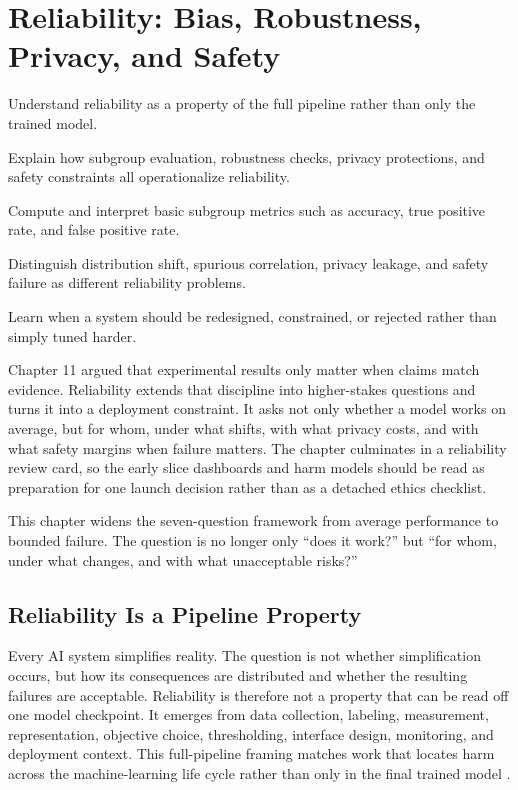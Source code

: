 \chapter{Reliability: Bias, Robustness, Privacy, and Safety}

\begin{learninggoals}
\item Understand reliability as a property of the full pipeline rather than only the trained model.
\item Explain how subgroup evaluation, robustness checks, privacy protections, and safety constraints all operationalize reliability.
\item Compute and interpret basic subgroup metrics such as accuracy, true positive rate, and false positive rate.
\item Distinguish distribution shift, spurious correlation, privacy leakage, and safety failure as different reliability problems.
\item Learn when a system should be redesigned, constrained, or rejected rather than simply tuned harder.
\end{learninggoals}

Chapter 11 argued that experimental results only matter when claims match evidence. Reliability extends that discipline into higher-stakes questions and turns it into a deployment constraint. It asks not only whether a model works on average, but for whom, under what shifts, with what privacy costs, and with what safety margins when failure matters. The chapter culminates in a reliability review card, so the early slice dashboards and harm models should be read as preparation for one launch decision rather than as a detached ethics checklist.

\begin{problemsolvinglens}
This chapter widens the seven-question framework from average performance to bounded failure. The question is no longer only ``does it work?'' but ``for whom, under what changes, and with what unacceptable risks?''
\end{problemsolvinglens}

\section{Reliability Is a Pipeline Property}

Every AI system simplifies reality. The question is not whether simplification occurs, but how its consequences are distributed and whether the resulting failures are acceptable. Reliability is therefore not a property that can be read off one model checkpoint. It emerges from data collection, labeling, measurement, representation, objective choice, thresholding, interface design, monitoring, and deployment context. This full-pipeline framing matches work that locates harm across the machine-learning life cycle rather than only in the final trained model \citep{suresh2021}.

